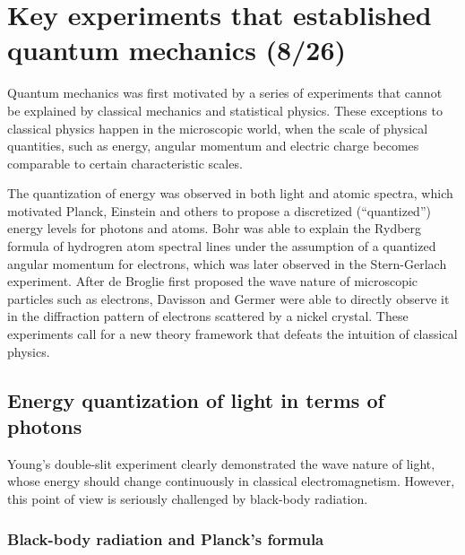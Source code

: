 \section{Key experiments that established quantum mechanics (8/26)}


Quantum mechanics was first motivated by a series of experiments that cannot be explained by classical mechanics and statistical physics. These exceptions to classical physics happen in the microscopic world, when the scale of physical quantities, such as energy, angular momentum and electric charge becomes comparable to certain characteristic scales.

The quantization of energy was observed in both light and atomic spectra, which motivated Planck, Einstein and others to propose a discretized (``quantized'') energy levels for photons and atoms. Bohr was able to explain the Rydberg formula\cite{Rydberg1890} of hydrogren atom spectral lines under the assumption of a quantized angular momentum for electrons, which was later observed in the Stern-Gerlach experiment\cite{Gerlach1922}. After de Broglie first proposed the wave nature of microscopic particles such as electrons, Davisson and Germer\cite{Davisson1927} were able to directly observe it in the diffraction pattern of electrons scattered by a nickel crystal. These experiments call for a new theory framework that defeats the intuition of classical physics. 

\subsection{Energy quantization of light in terms of photons}

Young's double-slit experiment clearly demonstrated the wave nature of light, whose energy should change continuously in classical electromagnetism. However, this point of view is seriously challenged by black-body radiation. 

\subsubsection{Black-body radiation and Planck's formula}\label{sec:blackbody radiation}

